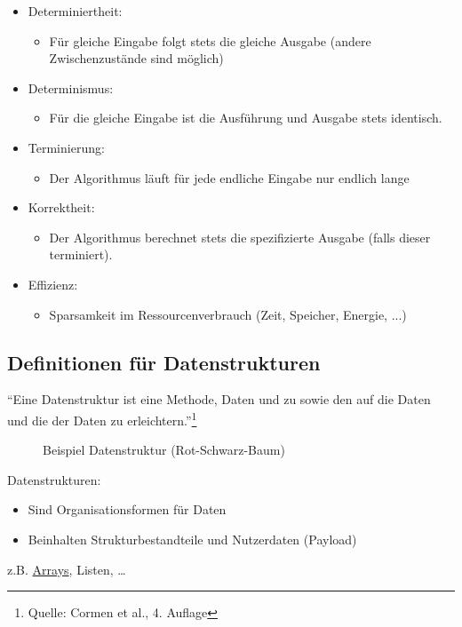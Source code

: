 \documentclass[
    ngerman,
    color=3b,
    dark_mode,
    load_common, %
    summary,
    boxarc,
]{tuda_summary}
\begin{document}
\begin{itemize}
    \item Determiniertheit:\begin{itemize}
              \item Für gleiche Eingabe folgt stets die gleiche Ausgabe (andere Zwischenzustände sind möglich)
          \end{itemize}
    \item Determinismus:\begin{itemize}
              \item Für die gleiche Eingabe ist die Ausführung und Ausgabe stets identisch.
          \end{itemize}
    \item Terminierung:\begin{itemize}
              \item Der Algorithmus läuft für jede endliche Eingabe nur endlich lange
          \end{itemize}
    \item Korrektheit:\begin{itemize}
              \item Der Algorithmus berechnet stets die spezifizierte Ausgabe (falls dieser
                    terminiert).
          \end{itemize}
    \item Effizienz:\begin{itemize}
              \item Sparsamkeit im Ressourcenverbrauch (Zeit, Speicher, Energie, ...)
          \end{itemize}
\end{itemize}
\subsection{Definitionen für Datenstrukturen}\label{1.3}\label{Definitionen fuer Datenstrukturen}
"`Eine Datenstruktur ist eine Methode,
Daten  und zu  sowie
den  auf die Daten und die 
der Daten zu erleichtern."'\footnote{Quelle: Cormen et al., 4. Auflage}\\
\begin{wrapfigure}[5]{r}{.6\textwidth}
    \centering
    \caption{Beispiel Datenstruktur (Rot-Schwarz-Baum)}
    \label{fig:baum_beispiel}
\end{wrapfigure}
Datenstrukturen:\begin{itemize}
    \item Sind Organisationsformen für Daten
    \item Beinhalten Strukturbestandteile und Nutzerdaten (Payload)
\end{itemize}
z.B. \hyperref[2.2]{Arrays}, Listen, \ldots
\vspace*{2cm}
\end{document}
